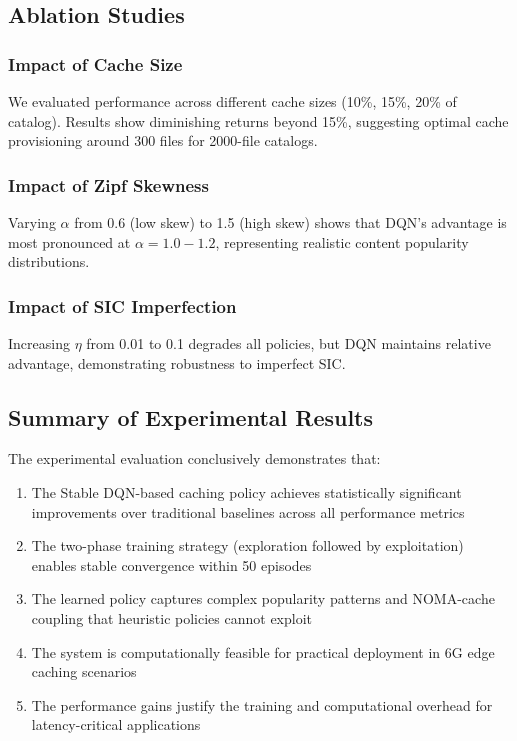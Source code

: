 \documentclass[12pt,a4paper]{article}
\begin{document}
\subsection{Ablation Studies}

\subsubsection{Impact of Cache Size}

We evaluated performance across different cache sizes (10\%, 15\%, 20\% of catalog). Results show diminishing returns beyond 15\%, suggesting optimal cache provisioning around 300 files for 2000-file catalogs.

\subsubsection{Impact of Zipf Skewness}

Varying $\alpha$ from 0.6 (low skew) to 1.5 (high skew) shows that DQN's advantage is most pronounced at $\alpha = 1.0-1.2$, representing realistic content popularity distributions.

\subsubsection{Impact of SIC Imperfection}

Increasing $\eta$ from 0.01 to 0.1 degrades all policies, but DQN maintains relative advantage, demonstrating robustness to imperfect SIC.

\subsection{Summary of Experimental Results}

The experimental evaluation conclusively demonstrates that:

\begin{enumerate}
    \item The Stable DQN-based caching policy achieves statistically significant improvements over traditional baselines across all performance metrics
    \item The two-phase training strategy (exploration followed by exploitation) enables stable convergence within 50 episodes
    \item The learned policy captures complex popularity patterns and NOMA-cache coupling that heuristic policies cannot exploit
    \item The system is computationally feasible for practical deployment in 6G edge caching scenarios
    \item The performance gains justify the training and computational overhead for latency-critical applications
\end{enumerate}
\end{document}
